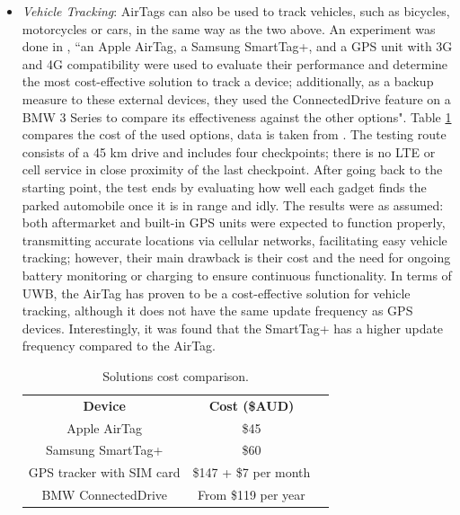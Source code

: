 \documentclass[english]{article}
\begin{document}
\begin{itemize}
  \item \textit{Vehicle Tracking}: AirTags can also be used to track vehicles, such as bicycles, motorcycles or cars, in the same way as the two above. An experiment was done in \cite{Maric2023}, ``an Apple AirTag, a Samsung SmartTag+, and a GPS unit with 3G and 4G compatibility were used to evaluate their performance and determine the most cost-effective solution to track a device; additionally, as a backup measure to these external devices, they used the ConnectedDrive feature on a BMW 3 Series to compare its effectiveness against the other options". Table \ref{vehicles} compares the cost of the used options, data is taken from \cite{Maric2023}. The testing route consists of a 45 km drive and includes four checkpoints; there is no LTE or cell service in close proximity of the last checkpoint. After going back to the starting point, the test ends by evaluating how well each gadget finds the parked automobile once it is in range and idly. The results were as assumed: both aftermarket and built-in GPS units were expected to function properly, transmitting accurate locations via cellular networks, facilitating easy vehicle tracking; however, their main drawback is their cost and the need for ongoing battery monitoring or charging to ensure continuous functionality. In terms of UWB, the AirTag has proven to be a cost-effective solution for vehicle tracking, although it does not have the same update frequency as GPS devices. Interestingly, it was found that the SmartTag+ has a higher update frequency compared to the AirTag.
  \begin{table}[h] 
    \caption{Solutions cost comparison.}
      \centering
      \begin{tabular}{|c|c|c}
        \cline{1-2}
        \textbf{Device}           & \textbf{Cost (\$AUD)}  &  \\ \cline{1-2}
        Apple AirTag              & \$45                   &  \\ \cline{1-2}
        Samsung SmartTag+         & \$60                   &  \\ \cline{1-2}
        GPS tracker with SIM card & \$147 + \$7 per month &  \\ \cline{1-2}
        BMW ConnectedDrive        & From \$119 per year    &  \\ \cline{1-2}
        \end{tabular}
        \label{vehicles}
      \end{table}


\end{itemize}
\end{document}
